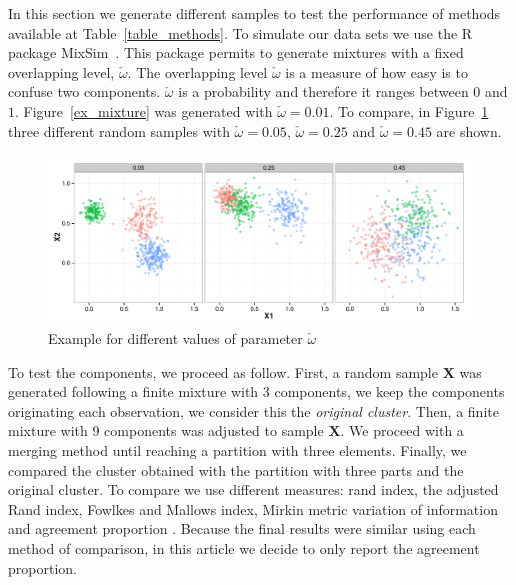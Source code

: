 \documentclass[10pt, a4paper]{article}
\newcommand{\m}[1]{\boldsymbol{#1}}
\begin{document}
\begin{spacing}{1.9}
In this section we generate different samples to test the performance of methods available at Table~\ref{table_methods}. To simulate our data sets we use the R package MixSim~\citep{melnikov2012mixsim}. This package permits to generate mixtures with a fixed overlapping level, $\check{\omega}$. The overlapping level $\check{\omega}$ is a measure of how easy is to confuse two components. $\check{\omega}$ is a probability and therefore it ranges between $0$ and $1$. Figure~\ref{ex_mixture} was generated with $\check{\omega} = 0.01$. To compare, in Figure~\ref{omega} three different random samples with $\check{\omega}=0.05$, $\check{\omega}=0.25$ and $\check{\omega}=0.45$ are shown. 

\begin{figure}[!t]
\centering
\includegraphics[scale=.5]{omega.pdf}
\caption{Example for different values of parameter $\check{\omega}$}
\label{omega}
\end{figure}


To test the components, we proceed as follow. First, a random sample $\m X$ was generated following a finite mixture with 3 components, we keep the components originating each observation, we consider this the \emph{original cluster}. Then, a finite mixture with 9 components was adjusted to sample $\m X$. We proceed with a merging method until reaching a partition with three elements. Finally, we compared the cluster obtained with the partition with three parts and the original cluster. To compare we use different measures: rand index, the adjusted Rand index, Fowlkes and Mallows index, Mirkin metric variation of information and agreement proportion \citep{meila2006comparing}. Because the final results were similar using each method of comparison, in this article we decide to only report the agreement proportion.


\end{spacing}
\end{document}
